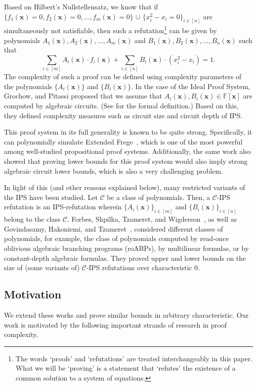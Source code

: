 \documentclass[11pt]{article}
\newcommand{\xbar}{\mathbf{x}}
\begin{document}
Based on Hilbert's Nullstellensatz, we know that if $\{f_1(\mathbf{x}) = 0, f_2(\mathbf{x}) = 0, \ldots, f_m(\mathbf{x}) = 0\}$ $\cup$ $\{x_i^2 - x_i=0\}_{i \in [n]}$ are simultaneously not satisfiable, then such a refutation\footnote{The words `proofs' and `refutations' are treated interchangeably in this paper. What we will be `proving' is a statement that `refutes' the existence of a common solution to a system of equations.} can be given by polynomials $A_1(\mathbf{x}), A_2(\mathbf{x}), \ldots, A_m(\mathbf{x})$ and $B_1(\mathbf{x}), B_2(\mathbf{x}), \ldots, B_n(\mathbf{x})$ such that
\begin{equation}
    \sum_{i \in [m]} A_i(\mathbf{x}) \cdot f_i(\mathbf{x}) +  \sum_{i \in [n]} B_i(\mathbf{x}) \cdot (x_i^2 - x_i) = 1.
\end{equation}
The complexity of such a proof can be defined using complexity parameters of the polynomials $\{A_i(\xbar)\}$ and $\{B_i(\xbar)\}$. 
In the case of the Ideal Proof System, Grochow, and Pitassi proposed that we assume that $A_i(\xbar), B_i(\xbar) \in \mathbb{F}[\xbar]$ are computed by algebraic circuits. (See  for the formal definition.) Based on this, they defined complexity measures such as circuit size and circuit depth of IPS. 

This proof system in its full generality is known to be quite strong. Specifically, it can polynomially simulate Extended Frege~\cite{GP14}, which is one of the most powerful among well-studied propositional proof systems. Additionally, the same work also showed that proving lower bounds for this proof system would also imply strong algebraic circuit lower bounds, which is also a very challenging problem. 

 In light of this (and other reasons explained below), many restricted variants of the IPS have been studied. Let $\mathcal{C}$ be a class of polynomials. Then, a $\mathcal{C}$-IPS refutation is an IPS-refutation wherein $\{A_i(\xbar)\}_{i \in [m]}$ and $\{B_i(\xbar)\}_{i \in [n]}$ belong to the class $\mathcal{C}$. Forbes, Shpilka, Tzameret, and Wigderson~\cite{FSTW21}, as well as Govindasamy, Hakoniemi, and Tzameret~\cite{GHT}, considered different classes of polynomials, for example, the class of polynomials computed by read-once oblivious algebraic branching programs (roABPs), by multilinear formulas, or by constant-depth algebraic formulas. They proved upper and lower bounds on the size of (some variants of) $\mathcal{C}$-IPS refutations over characteristic $0$. 
\subsection{Motivation}
\label{sec:motivation}
We extend these works and prove similar bounds in arbitrary characteristic. 
Our work is motivated by the following important strands of research in proof complexity. 
\end{document}
